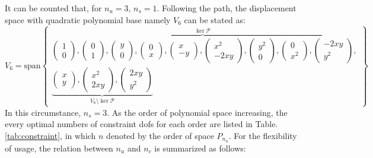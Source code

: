 It can be counted that, for $n_u = 3$, $n_s = 1$. Following the path, the displacement space with quadratic polynomial base namely $V_6$ can be stated as:
\begin{equation}\label{base2}
V_6 = \mathrm{span}
\begin{Bmatrix}
\overbrace{
\begin{pmatrix} 1 \\ 0 \end{pmatrix},
\begin{pmatrix} 0 \\ 1 \end{pmatrix},
\begin{pmatrix} y \\ 0 \end{pmatrix},
\begin{pmatrix} 0 \\ x \end{pmatrix},
\begin{pmatrix} x \\ -y \end{pmatrix},
\begin{pmatrix} x^2 \\ -2xy \end{pmatrix},
\begin{pmatrix} y^2 \\ 0 \end{pmatrix},
\begin{pmatrix} 0 \\ x^2 \end{pmatrix},
\begin{pmatrix} -2xy \\ y^2 \end{pmatrix}
}^{\ker \mathcal P}, \\
\underbrace{
\begin{pmatrix} x \\ y \end{pmatrix},
\begin{pmatrix} x^2 \\ 2xy \end{pmatrix},
\begin{pmatrix} 2xy \\ y^2 \end{pmatrix}
}_{V_6\setminus \ker \mathcal P}
\end{Bmatrix}
\end{equation}
In this circumstance, $n_s = 3$. As the order of polynomial space increasing, the every optimal numbers of constraint dofs for each order are listed in Table. \ref{tab:constraint}, 
in which $n$ denoted by the order of space $P_{n_u}$.
For the flexibility of usage, the relation between $n_u$ and $n_c$ is summarized as follows:

